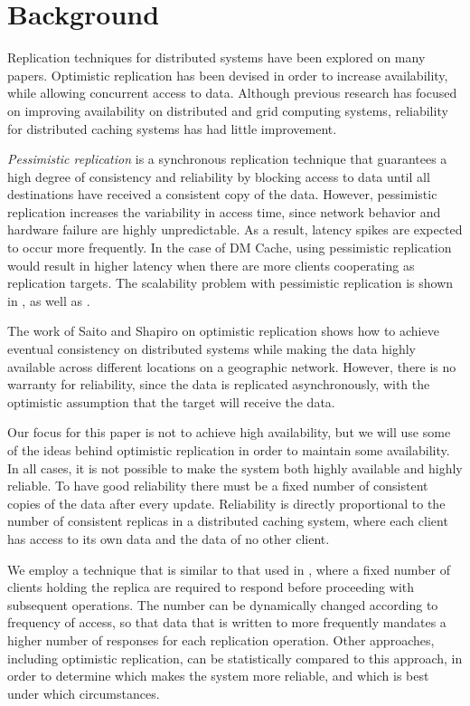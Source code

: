 \section{Background}

Replication techniques for distributed systems have been
explored on many papers. Optimistic replication has been devised
in order to increase availability, while allowing
concurrent access to data\cite{Replication}. Although
previous research has focused on improving availability on
distributed\cite{globally-distributed} and grid computing
systems\cite{Online-Grid}, reliability for distributed caching
systems has had little improvement.

\textit{Pessimistic replication} is a synchronous replication
technique that guarantees a high degree of consistency and
reliability by blocking access to data until all destinations
have received a consistent copy of the data. However, pessimistic
replication increases the variability in access time, since
network behavior and hardware failure are highly unpredictable.
As a result, latency spikes are expected to occur more frequently.
In the case of DM Cache, using pessimistic replication would
result in higher latency when there are more clients cooperating
as replication targets. The scalability problem with pessimistic
replication is shown in \cite{Replicated-Services}, as well as
\cite{Replication-Cost}.

The work of Saito and Shapiro on 
optimistic replication\cite{Replication} shows how to achieve
eventual consistency on distributed systems while making the
data highly available across different locations on a geographic
network. However, there is no warranty for reliability, since the
data is replicated asynchronously, with the optimistic
assumption that the target will receive the data.

Our focus for this paper is not to achieve high
availability, but we will use some of the ideas behind optimistic
replication in order to maintain some availability. In all cases,
it is not possible to make the system both highly available and
highly reliable. To have good reliability there must be a fixed
number of consistent copies of the data after every update.
Reliability is directly proportional to the number of consistent
replicas in a distributed caching system, where each client has
access to its own data and the data of no other client.

We employ a technique that is similar to
that used in \cite{dynamo}, where a fixed number of clients
holding the replica are required to respond before proceeding with
subsequent operations. The number can be dynamically changed
according to frequency of access, so that data that is written to
more frequently mandates a higher number of responses for each
replication operation. Other approaches, including optimistic
replication, can be statistically compared to this approach, in
order to determine which makes the system more reliable, and which
is best under which circumstances.

